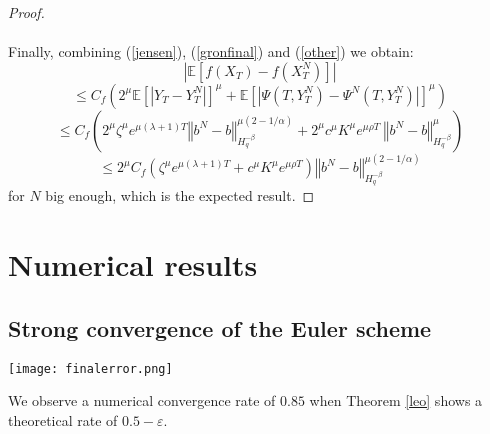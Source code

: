\documentclass[12pt]{article}
\newcommand{\norme}[1]{\left\Vert #1\right\Vert}
\newcommand{\E}{\mathbb{E}}
\begin{document}
\begin{proof}
    \paragraph{}
    Finally, combining (\ref{jensen}), (\ref{gronfinal}) and (\ref{other}) we obtain:    
    \begin{equation*}
    \left|\E\left[f\left(X_T\right)-f\left(X_T^N\right)\right]\right| 
    \end{equation*}
    \begin{equation*}
    \leq C_f  \left(2^\mu\E\left[\left|Y_T-Y_T^N\right|\right]^\mu+\E\left[\left|\Psi\left(T,Y_T^N\right)-\Psi^N\left(T,Y_T^N\right)\right|\right]^\mu\right)
    \end{equation*} 
    \begin{equation*}
    \leq C_f  \left(2^\mu\zeta^\mu e^{\mu(\lambda+1)T} \norme{b^N-b}_{H^{-\beta}_{q}}^{\mu(2-1/\alpha)}+2^\mu c^\mu K^\mu e^{\mu\rho T}\ \norme{b^N-b}_{H^{-\beta}_q}^\mu\right)
    \end{equation*}
    \begin{equation*}
    \leq 2^\mu C_f  \left(\zeta^\mu e^{\mu(\lambda+1)T} + c^\mu K^\mu e^{\mu\rho T}\right)\norme{b^N-b}_{H^{-\beta}_{q}}^{\mu(2-1/\alpha)}
    \end{equation*}       
    for $N$ big enough, which is the expected result.
    
\end{proof}   

\section{Numerical results}
    \subsection{Strong convergence of the Euler scheme}
    
        \begin{center}
            \texttt{[image: finalerror.png]}
        \end{center}
    
    We observe a numerical convergence rate of $0.85$ when Theorem \ref{leo} shows a theoretical rate of $0.5-\varepsilon$.
 


    
\end{document}
